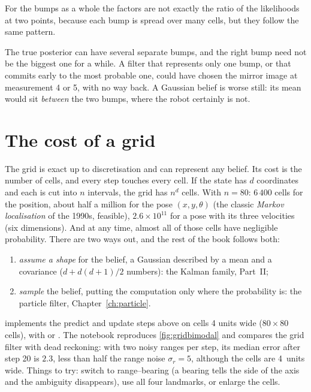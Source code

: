 For the bumps as a whole the factors are not exactly the ratio of the
likelihoods at two points, because each bump is spread over many cells,
but they follow the same pattern.

\begin{inwords}
The true posterior can have several separate bumps, and the right bump
need not be the biggest one for a while. A filter that represents only
one bump, or that commits early to the most probable one, could have
chosen the mirror image at measurement 4 or 5, with no way back. A Gaussian
belief is worse still: its mean would sit \emph{between} the two bumps,
where the robot certainly is not.
\end{inwords}

\section{The cost of a grid}

The grid is exact up to discretisation and can represent any belief. Its
cost is the number of cells, and every step touches every cell. If the
state has $d$ coordinates and each is cut into $n$ intervals, the grid has
$n^d$ cells. With $n=80$: $6\,400$ cells for the position, about half a million for the
pose $(x,y,\theta)$ (the classic \emph{Markov localisation} of the 1990s,
feasible), $2.6\times10^{11}$ for a pose with its three velocities (six
dimensions). And at any
time, almost all of those cells have negligible probability. There are two
ways out, and the rest of the book follows both:
\begin{enumerate}[nosep]
\item \emph{assume a shape} for the belief, a Gaussian described by a mean
  and a covariance ($d+d(d+1)/2$ numbers): the Kalman family,
  Part~II;
\item \emph{sample} the belief, putting the computation only where the
  probability is: the particle filter, Chapter~\ref{ch:particle}.
\end{enumerate}

\begin{practice}
 implements the predict and update steps above on cells
4 units wide ($80\times80$ cells), with  or . The notebook
reproduces \cref{fig:gridbimodal} and compares the grid filter with dead
reckoning: with two noisy ranges per step, its median error after step 20
is $2.3$, less than half the range noise $\sigma_r=5$, although the cells are
4~units wide. Things to try:
switch to range--bearing (a bearing tells the side of the axis and the
ambiguity disappears), use all four landmarks, or enlarge the cells.
\end{practice}

